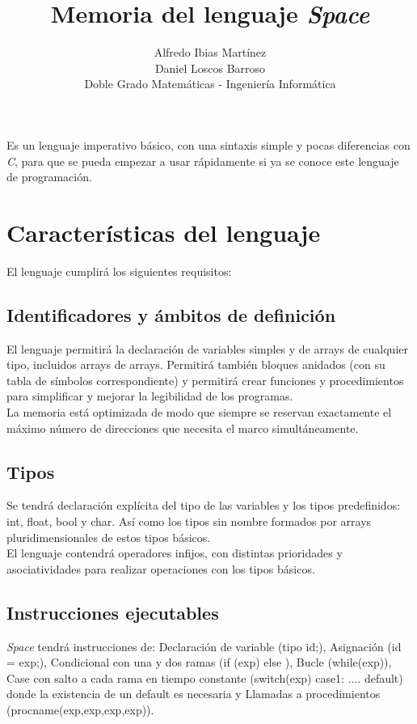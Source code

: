 \documentclass[a4paper, 12pt]{article}
\begin{document}
\title{\Huge \bf Memoria del lenguaje \textit{Space}}
\author{
	\small Alfredo Ibias Martínez\\
	\small Daniel Loscos Barroso\\
    \small Doble Grado Matemáticas - Ingeniería Informática
    }
\date{}
\maketitle

Es un lenguaje imperativo básico, con una sintaxis simple y pocas diferencias con \textit{C}, para que se pueda empezar a usar rápidamente si ya se conoce este lenguaje de programación.

\section{Características del lenguaje}
El lenguaje cumplirá los siguientes requisitos:

\subsection{Identificadores y ámbitos de definición}
El lenguaje permitirá la declaración de variables simples y de arrays de cualquier tipo, incluidos arrays de arrays. Permitirá también bloques anidados (con su tabla de símbolos correspondiente) y permitirá crear funciones y procedimientos para simplificar y mejorar la legibilidad de los programas.\\

La memoria está optimizada de modo que siempre se reservan exactamente el máximo número de direcciones que necesita el marco simultáneamente.

\subsection{Tipos}
Se tendrá declaración explícita del tipo de las variables y los tipos predefinidos: int, float, bool y char. Así como los tipos sin nombre formados por arrays pluridimensionales de estos tipos básicos.\\

El lenguaje contendrá operadores infijos, con distintas prioridades y asociatividades para realizar operaciones con los tipos básicos.

\subsection{Instrucciones ejecutables}
\textit{Space} tendrá instrucciones de: Declaración de variable (tipo id;), Asignación (id = exp;), Condicional con una y dos ramas (if (exp) {} else {}), Bucle (while(exp){}), Case con salto a cada rama en tiempo constante (switch(exp) case1: {} .... default{}) donde la existencia de un default es necesaria y Llamadas a procedimientos (procname(exp,exp,exp,exp)).\\
\end{document}
